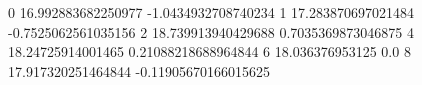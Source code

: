 0 16.992883682250977 -1.0434932708740234
1 17.283870697021484 -0.7525062561035156
2 18.739913940429688 0.7035369873046875
4 18.24725914001465 0.21088218688964844
6 18.036376953125 0.0
8 17.917320251464844 -0.11905670166015625
